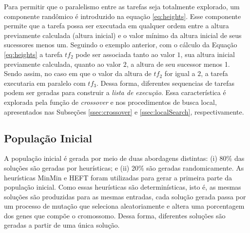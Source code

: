 Para permitir que o paralelismo entre as tarefas seja totalmente explorado, um componente randômico é introduzido na equação \ref{eq:heights}. Esse componente permite que a tarefa possa ser executada em qualquer ordem entre a altura previamente calculada (altura inicial) e o valor mínimo da altura inicial de seus sucessores menos um. Seguindo o exemplo anterior, com o cálculo da Equação \ref{eq:heights} a tarefa $tf_2$  pode ser associada tanto ao valor $1$, sua altura inicial previamente calculada, quanto ao valor $2$, a altura de seu sucessor menos 1. Sendo assim, no caso em que o valor da altura de $tf_2$ for igual a $2$, a tarefa executaria em paralelo com $tf_3$. Dessa forma, diferentes sequencias de tarefas podem ser geradas para construir a \textit{lista de execução}. Essa característica é explorada pela função de \textit{crossover} e nos procedimentos de busca local, apresentados nas Subseções \ref{ssec:crossover} e \ref{ssec:localSearch}, respectivamente.




\subsection{População Inicial} \label{sssec:initialPopulation}

A população inicial é gerada por meio de duas abordagens distintas: (i) 80\% das soluções são geradas por heurísticas; e (ii) 20\% são geradas randomicamente.  As heurísticas MinMin \cite{minmin} e HEFT \cite{HEFT} foram utilizadas para gerar a primeira parte da população inicial. Como essas heurísticas são determinísticas, isto é, as mesmas soluções são produzidas para as mesmas entradas, cada solução gerada passa por um processo de mutação que seleciona aleatoriamente e altera uma porcentagem dos genes que compõe o cromossomo. Dessa forma, diferentes soluções são geradas a partir de uma única solução. 

